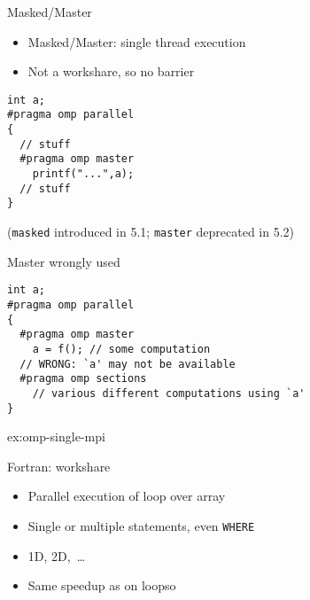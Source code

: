 \begin{numberedframe}{Masked/Master}
  \begin{itemize}
  \item Masked/Master: single thread execution
  \item Not a workshare, so no barrier
  \end{itemize}
\begin{lstlisting}
int a;
#pragma omp parallel
{
  // stuff
  #pragma omp master
    printf("...",a);
  // stuff
}
\end{lstlisting}
(\lstinline{masked} introduced in 5.1; \lstinline{master} deprecated in 5.2)
\end{numberedframe}

\begin{numberedframe}{Master wrongly used}
\begin{lstlisting}
int a;
#pragma omp parallel
{
  #pragma omp master
    a = f(); // some computation
  // WRONG: `a' may not be available
  #pragma omp sections
    // various different computations using `a'
}
\end{lstlisting}
\end{numberedframe}

\begin{exerciseframe}
   {ex:omp-single-mpi}
\end{exerciseframe}

\begin{numberedframe}{Fortran: workshare}
  \begin{itemize}
  \item Parallel execution of loop over array
   \item Single or multiple statements, even \lstinline{WHERE}
  \item 1D, 2D,~\ldots
  \item Same speedup as on loopso
  \end{itemize}
\end{numberedframe}

\endinput

\begin{numberedframe}{}
  \begin{itemize}
  \item 
  \end{itemize}
\end{numberedframe}

\begin{numberedframe}{}
  \begin{itemize}
  \item 
  \end{itemize}
\end{numberedframe}

\begin{numberedframe}{}
  \begin{itemize}
  \item 
  \end{itemize}
\end{numberedframe}

\begin{numberedframe}{}
  \begin{itemize}
  \item 
  \end{itemize}
\end{numberedframe}


